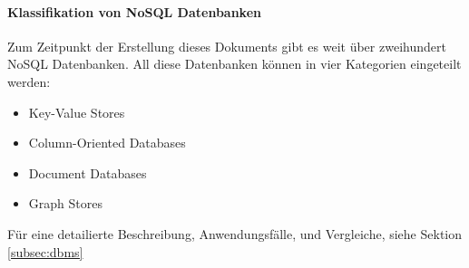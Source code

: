 \paragraph{Klassifikation von NoSQL Datenbanken\newline}
Zum Zeitpunkt der Erstellung dieses Dokuments gibt es weit über zweihundert NoSQL Datenbanken\cite{MELD.CH2-noSQL.listOfNoSQLDB}. All diese Datenbanken können in vier Kategorien eingeteilt werden:

\begin{itemize}
	\item Key-Value Stores
	\item Column-Oriented Databases
	\item Document Databases
	\item Graph Stores
\end{itemize}

Für eine detailierte Beschreibung, Anwendungsfälle, und Vergleiche, siehe Sektion \ref{subsec:dbms}

\clearpage